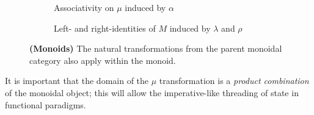 \begin{figure}[ht]
        \vspace{\belowcaptionskip}
        \begin{subfigure}{\textwidth}
                \centering
                \caption{Associativity on $\mu$ induced by $\alpha$}
        \end{subfigure}
        \vspace{-1.5em}
        \begin{subfigure}{\textwidth}
                \centering
                \vspace{-.5em}
                \caption{Left- and right-identities of $M$ induced by $\lambda$
                        and $\rho$}
        \end{subfigure}%
        \caption{\textbf{(Monoids)} The natural transformations from the parent
                monoidal category also apply within the monoid.}
        \label{fig:monoid-commute}
\end{figure}

It is important that the domain of the $\mu$ transformation is a \emph{product
combination} of the monoidal object; this will allow the imperative-like
threading of state in functional paradigms.

